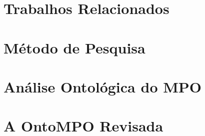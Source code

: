 \documentclass[12pt]{article}
\begin{document}
\section{Trabalhos Relacionados}
\label{sec:relacionados}


\section{Método de Pesquisa}
\label{sec:metodo}


\section{Análise Ontológica do MPO}
\label{sec:analise}


\section{A OntoMPO Revisada}
\label{sec:ontompo}


\end{document}
